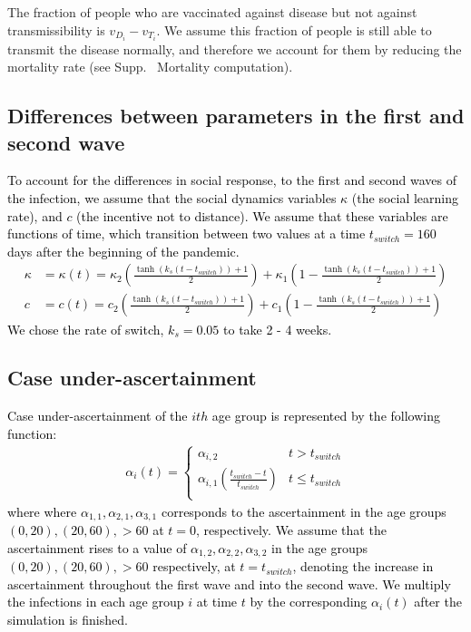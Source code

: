 The fraction of people who are vaccinated against disease but not against transmissibility is $v_{D_i} - v_{T_i}$. We assume this fraction of people is still able to transmit the disease normally, and therefore we account for them by reducing the mortality rate (see Supp. ~Mortality computation). 


\subsection{Differences between parameters in the first and second wave}


 \textcolor{black}{To account for the differences in social response, to the first and second waves of the infection, we assume that the social dynamics variables $\kappa$ (the social learning rate), and $c$ (the incentive not to distance). We assume that these variables are functions of time, which transition between two values at a time $t_{switch} = 160$ days after the beginning of the pandemic.
\begin{align}
    \kappa &= \kappa(t) = \kappa_2 \left(\frac{\tanh\left(k_s(t - t_{switch})\right) + 1}{2}\right) +  \kappa_1 \left(1 - \frac{\tanh\left(k_s(t - t_{switch})\right) + 1}{2}\right)\\
    c &= c(t) = c_2 \left(\frac{\tanh\left(k_s(t - t_{switch})\right) + 1}{2}\right) + c_1 \left(1 - \frac{\tanh\left(k_s(t - t_{switch})\right) + 1}{2}\right)
\end{align}
We chose the rate of switch, $k_s= 0.05$ to take 2 - 4 weeks.}

\subsection{Case under-ascertainment} 
 \textcolor{black}{
Case under-ascertainment of the $ith$ age group is represented by the following function:
\begin{eqnarray}
\alpha_i(t) = \left\{
  \begin{array}{ll}
          \alpha_{i,2} & t >t_{switch}\\ 
          \alpha_{i,1}\left(\frac{t_{switch} - t}{t_{switch}}\right) & t \leq t_{switch}\\
    \end{array} 
 \right.
\end{eqnarray}
where where $\alpha_{1,1}, \alpha_{2,1}, \alpha_{3,1}$ corresponds to the ascertainment in the age groups $(0,20),(20,60),> 60$ at $t = 0$, respectively. We assume that the ascertainment rises to a value of $\alpha_{1,2}, \alpha_{2,2}, \alpha_{3,2}$ in the age groups $(0,20),(20,60),> 60$ respectively, at $t = t_{switch}$, denoting the increase in ascertainment throughout the first wave and into the second wave. We multiply the infections in each age group $i$ at time $t$ by the corresponding $\alpha_i(t)$ after the simulation is finished.}

